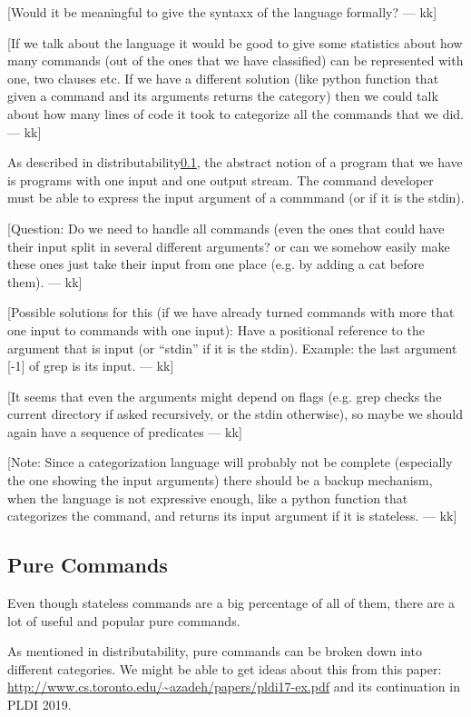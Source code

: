 \documentclass[sigplan,10pt,review,anonymous]{acmart}
\newcommand{\kk}[1]{[{\color{magenta}#1 --- kk}]}
\begin{document}
\kk{Would it be meaningful to give the syntaxx of the language
  formally?}

\kk{If we talk about the language it would be good to give some
  statistics about how many commands (out of the ones that we have
  classified) can be represented with one, two clauses etc. If we have
  a different solution (like python function that given a command and
  its arguments returns the category) then we could talk about how
  many lines of code it took to categorize all the commands that we
  did.}

As described in distributability\ref{}, the abstract notion of a
program that we have is programs with one input and one output
stream. The command developer must be able to express the input
argument of a commmand (or if it is the stdin).

\kk{Question: Do we need to handle all commands (even the ones that
  could have their input split in several different arguments? or can
  we somehow easily make these ones just take their input from one
  place (e.g. by adding a cat before them).}

\kk{Possible solutions for this (if we have already turned commands
  with more that one input to commands with one input): Have a
  positional reference to the argument that is input (or ``stdin'' if
  it is the stdin). Example: the last argument [-1] of grep is its
  input.}

\kk{It seems that even the arguments might depend on flags (e.g. grep
  checks the current directory if asked recursively, or the stdin
  otherwise), so maybe we should again have a sequence of predicates}


\kk{Note: Since a categorization language will probably not be
  complete (especially the one showing the input arguments) there
  should be a backup mechanism, when the language is not expressive
  enough, like a python function that categorizes the command, and
  returns its input argument if it is stateless.}

\subsection{Pure Commands}

Even though stateless commands are a big percentage of all of them,
there are a lot of useful and popular pure commands.

As mentioned in distributability, pure commands can be broken down
into different categories. We might be able to get ideas about this
from this paper:
\url{http://www.cs.toronto.edu/~azadeh/papers/pldi17-ex.pdf} and its
continuation in PLDI 2019.
\end{document}

